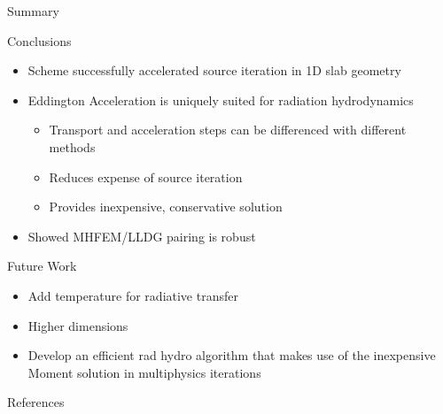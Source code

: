 \documentclass[10pt,draft]{beamer}
\begin{document}
\begin{frame}{Summary}

	\onslide<+->
	Conclusions
	\begin{itemize} \vspace{-.1in}
		\item Scheme successfully accelerated source iteration in 1D slab geometry

		\item Eddington Acceleration is uniquely suited for radiation hydrodynamics 
		\begin{itemize}
			\item Transport and acceleration steps can be differenced with different methods 
			\item Reduces expense of source iteration 
			\item Provides inexpensive, conservative solution 
		\end{itemize}

		\item Showed MHFEM/LLDG pairing is robust 

	\end{itemize}

	\onslide<+->
	Future Work 
	\begin{itemize} \vspace{-.1in}

		\item Add temperature for radiative transfer 

		\item Higher dimensions 

		\item Develop an efficient rad hydro algorithm that makes use of the inexpensive Moment solution in multiphysics iterations 

	\end{itemize}

\end{frame}

\appendix

\begin{frame}{References}

	\nocite{adams,morel,llnl,alcouffe,mhfem,hydro,bolding,nonlinearAccel}
	
	

\end{frame}
\end{document}
